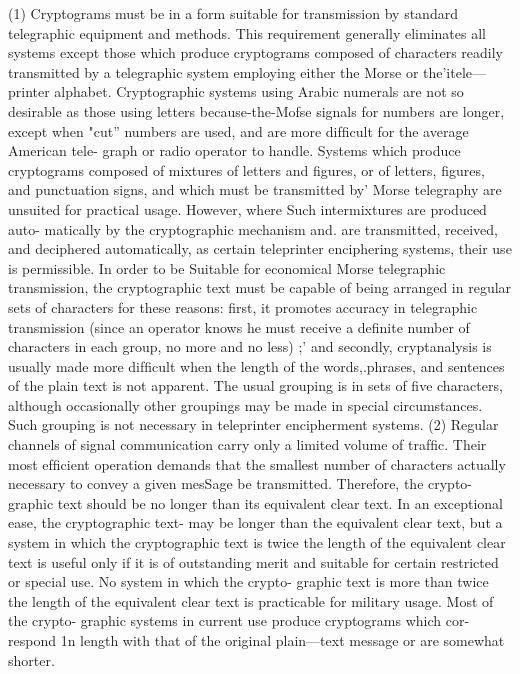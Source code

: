 (1) Cryptograms must be in a form suitable for transmission by
standard telegraphic equipment and methods. This requirement
generally eliminates all systems except those which produce
cryptograms composed of characters readily transmitted by a
telegraphic system employing either the Morse or the'itele—
printer alphabet. Cryptographic systems using Arabic numerals
are not so desirable as those using letters because-the-Mofse
signals for numbers are longer, except when "cut” numbers
are used, and are more difﬁcult for the average American tele-
graph or radio operator to handle. Systems which produce
cryptograms composed of mixtures of letters and ﬁgures, or
of letters, ﬁgures, and punctuation signs, and which must be
transmitted by' Morse telegraphy are unsuited for practical
usage. However, where Such intermixtures are produced auto-
matically by the cryptographic mechanism and. are transmitted,
received, and deciphered automatically, as certain teleprinter
enciphering systems, their use is permissible. In order to be
Suitable for economical Morse telegraphic transmission, the
cryptographic text must be capable of being arranged in regular
sets of characters for these reasons: ﬁrst, it promotes accuracy
in telegraphic transmission (since an operator knows he must
receive a definite number of characters in each group, no more
and no less) ;' and secondly, cryptanalysis is usually made more
difﬁcult when the length of the words,.phrases, and sentences
of the plain text is not apparent. The usual grouping is in sets
of ﬁve characters, although occasionally other groupings may
be made in special circumstances. Such grouping is not necessary
in teleprinter encipherment systems.
(2) Regular channels of signal communication carry only a 
limited volume of trafﬁc. Their most efﬁcient operation demands
that the smallest number of characters actually necessary to
convey a given mesSage be transmitted. Therefore, the crypto-
graphic text should be no longer than its equivalent clear text.
In an exceptional ease, the cryptographic text- may be longer
than the equivalent clear text, but a system in which the
cryptographic text is twice the length of the equivalent clear
text is useful only if it is of outstanding merit and suitable for
certain restricted or special use. No system in which the crypto-
graphic text is more than twice the length of the equivalent
clear text is practicable for military usage. Most of the crypto-
graphic systems in current use produce cryptograms which cor-
respond 1n length with that of the original plain—text message
or are somewhat shorter.


